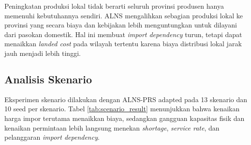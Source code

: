 \documentclass[journal]{IEEEtran}
\theoremstyle{definition}
\theoremstyle{definition}
\theoremstyle{plain}
\begin{document}
    \begin{table}[H]
    \centering
    \caption{Ringkasan kinerja per kluster pulau}
    \label{tab:cluster_result}
    \end{table}

    Peningkatan produksi lokal tidak berarti seluruh provinsi produsen hanya memenuhi kebutuhannya sendiri. ALNS mengalihkan sebagian produksi lokal ke provinsi yang secara biaya dan kebijakan lebih menguntungkan untuk dilayani dari pasokan domestik. Hal ini membuat \textit{import dependency} turun, tetapi dapat menaikkan \textit{landed cost} pada wilayah tertentu karena biaya distribusi lokal jarak jauh menjadi lebih tinggi.

    \subsection{Analisis Skenario}
    Eksperimen skenario dilakukan dengan ALNS-PRS adapted pada 13 skenario dan 10 seed per skenario. Tabel \ref{tab:scenario_result} menunjukkan bahwa kenaikan harga impor terutama menaikkan biaya, sedangkan gangguan kapasitas fisik dan kenaikan permintaan lebih langsung menekan \textit{shortage}, \textit{service rate}, dan pelanggaran \textit{import dependency}.
\end{document}
